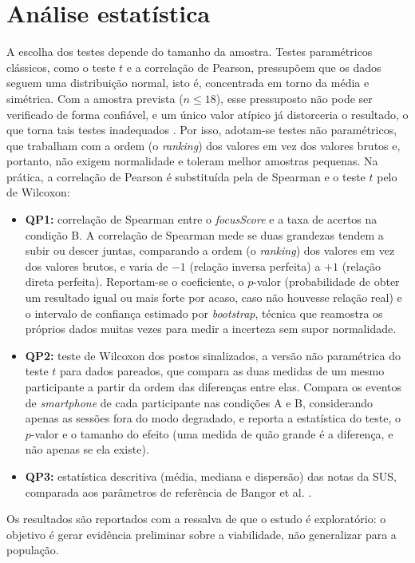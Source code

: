 \documentclass[portuguese,oneside]{tcc}
\begin{document}
\section{Análise estatística}
A escolha dos testes depende do tamanho da amostra. Testes paramétricos clássicos, como o teste $t$ e a correlação de Pearson, pressupõem que os dados seguem uma distribuição normal, isto é, concentrada em torno da média e simétrica. Com a amostra prevista ($n \leq 18$), esse pressuposto não pode ser verificado de forma confiável, e um único valor atípico já distorceria o resultado, o que torna tais testes inadequados \cite{Fie13}. Por isso, adotam-se testes não paramétricos, que trabalham com a ordem (o \emph{ranking}) dos valores em vez dos valores brutos e, portanto, não exigem normalidade e toleram melhor amostras pequenas. Na prática, a correlação de Pearson é substituída pela de Spearman e o teste $t$ pelo de Wilcoxon:
\begin{itemize}
  \item \textbf{QP1:} correlação de Spearman entre o \emph{focusScore} e a taxa de acertos na condição B. A correlação de Spearman mede se duas grandezas tendem a subir ou descer juntas, comparando a ordem (o \emph{ranking}) dos valores em vez dos valores brutos, e varia de $-1$ (relação inversa perfeita) a $+1$ (relação direta perfeita). Reportam-se o coeficiente, o $p$-valor (probabilidade de obter um resultado igual ou mais forte por acaso, caso não houvesse relação real) e o intervalo de confiança estimado por \emph{bootstrap}, técnica que reamostra os próprios dados muitas vezes para medir a incerteza sem supor normalidade.
  \item \textbf{QP2:} teste de Wilcoxon dos postos sinalizados, a versão não paramétrica do teste $t$ para dados pareados, que compara as duas medidas de um mesmo participante a partir da ordem das diferenças entre elas. Compara os eventos de \emph{smartphone} de cada participante nas condições A e B, considerando apenas as sessões fora do modo degradado, e reporta a estatística do teste, o $p$-valor e o tamanho do efeito (uma medida de quão grande é a diferença, e não apenas se ela existe).
  \item \textbf{QP3:} estatística descritiva (média, mediana e dispersão) das notas da SUS, comparada aos parâmetros de referência de Bangor et al. \cite{BKM08}.
\end{itemize}
Os resultados são reportados com a ressalva de que o estudo é exploratório: o objetivo é gerar evidência preliminar sobre a viabilidade, não generalizar para a população.
\end{document}
